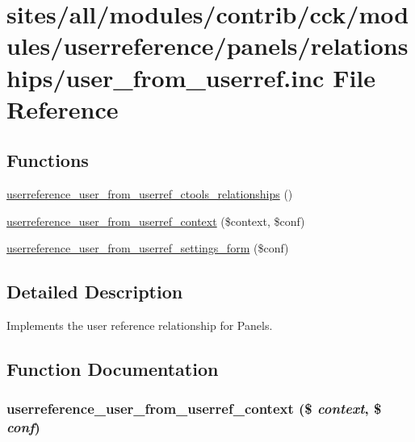 \hypertarget{user__from__userref_8inc}{
\section{sites/all/modules/contrib/cck/modules/userreference/panels/relationships/user\_\-from\_\-userref.inc File Reference}
\label{user__from__userref_8inc}
}
\subsection*{Functions}
\begin{CompactItemize}
\item 
\hyperlink{user__from__userref_8inc_1145f8c62d2340f48c135b6fd33f89a0}{userreference\_\-user\_\-from\_\-userref\_\-ctools\_\-relationships} ()
\item 
\hyperlink{user__from__userref_8inc_26c73ce20bef3500f97013b80c69ce67}{userreference\_\-user\_\-from\_\-userref\_\-context} (\$context, \$conf)
\item 
\hyperlink{user__from__userref_8inc_e88fcb5571b760f426a9b55cfc930b63}{userreference\_\-user\_\-from\_\-userref\_\-settings\_\-form} (\$conf)
\end{CompactItemize}


\subsection{Detailed Description}
Implements the user reference relationship for Panels. 

\subsection{Function Documentation}
\hypertarget{user__from__userref_8inc_26c73ce20bef3500f97013b80c69ce67}{
\subsubsection[{userreference\_\-user\_\-from\_\-userref\_\-context}]{\setlength{\rightskip}{0pt plus 5cm}userreference\_\-user\_\-from\_\-userref\_\-context (\$ {\em context}, \/  \$ {\em conf})}}
\label{user__from__userref_8inc_26c73ce20bef3500f97013b80c69ce67}


